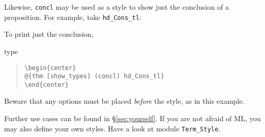 \begin{isabellebody}
\begin{isamarkuptext}
  Likewise, \verb!concl! may be used as a style to show just the
  conclusion of a proposition. For example, take \verb!hd_Cons_tl!:
  \begin{center}
  \end{center}
  To print just the conclusion,
  \begin{center}
  \end{center}
  type
  \begin{quote}
    \verb!\begin{center}!\\
    \verb!@!\verb!{thm [show_types] (concl) hd_Cons_tl}!\\
    \verb!\end{center}!
  \end{quote}
  Beware that any options must be placed \emph{before}
  the style, as in this example.

  Further use cases can be found in \S\ref{sec:yourself}.
  If you are not afraid of ML, you may also define your own styles.
  Have a look at module \verb|Term_Style|.%
\end{isamarkuptext}%
\isamarkuptrue%
%
\isadelimtheory
%
\endisadelimtheory
%
\isatagtheory
%
\endisatagtheory
{\isafoldtheory}%
%
\isadelimtheory
%
\endisadelimtheory
\end{isabellebody}%
